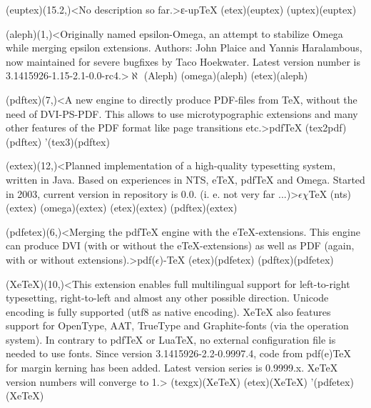 {	\steplayer[-1.5]

	\tonode(euptex)(15.2,\layer)<No description so far.>{ε-up\TeX}
		\todraw(etex)(euptex)
		\todraw(uptex)(euptex)

	\steplayer[-.5]

	\tonode(aleph)(1,\layer)<Originally named epsilon-Omega, an attempt to stabilize Omega while merging epsilon extensions. Authors: John Plaice and Yannis Haralambous, now maintained for severe bugfixes by Taco Hoekwater. Latest version number is 3.1415926-1.15-2.1-0.0-rc4.>{$\aleph$ (Aleph)}
		\todraw(omega)(aleph)
		\todraw(etex)(aleph)
	
	\tonode[\vip](pdftex)(7,\layer)<A new engine to directly produce PDF-files from TeX, without the need of DVI-PS-PDF. This allows to use microtypographic extensions and many other features of the PDF format like page transitions etc.>{pdf\TeX}
		\todraw(tex2pdf)(pdftex)
		\todraw'(tex3)(pdftex)
	
	\steplayer[-1]

	\tonode[\experimental](extex)(12,\layer)<Planned implementation of a high-quality typesetting system, written in Java. Based on experiences in NTS, eTeX, pdfTeX and Omega. Started in 2003, current version in repository is 0.0. (i. e. not very far ...)>{$\epsilon\chi$\TeX}
		\todraw(nts)(extex)
		\todraw(omega)(extex)
		\todraw(etex)(extex)
		\todraw(pdftex)(extex)

	\steplayer[-1]
	
	\tonode[\vip](pdfetex)(6,\layer)<Merging the pdfTeX engine with the eTeX-extensions. This engine can produce DVI (with or without the eTeX-extensions) as well as PDF (again, with or without extensions).>{pdf($\epsilon$)-\TeX}
		\todraw*(etex)(pdfetex)
		\todraw*(pdftex)(pdfetex)

	\tonode[\vip](XeTeX)(10,\layer)<This extension enables full multilingual support for left-to-right typesetting, right-to-left and almost any other possible direction. Unicode encoding is fully supported (utf8 as native encoding). XeTeX also features support for OpenType, AAT, TrueType and Graphite-fonts (via the operation system). In contrary to pdfTeX or LuaTeX, no external configuration file is needed to use fonts. Since version 3.1415926-2.2-0.9997.4, code from pdf(e)TeX for margin kerning has been added. Latest version series is 0.9999.x. XeTeX version numbers will converge to 1.>{\XeTeX}
		\todraw(texgx)(XeTeX)
		\todraw*(etex)(XeTeX)
		\todraw'(pdfetex)(XeTeX)
	
	\steplayer[-2]

}
